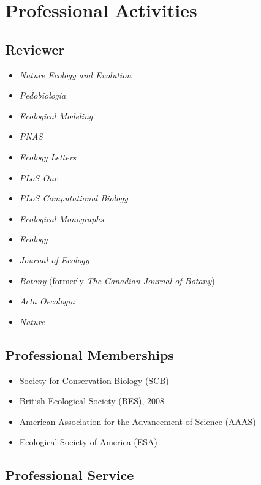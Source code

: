 \documentclass[a4paper]{article}
\begin{document}
\section{Professional Activities}\label{professional-activities}

\subsection{Reviewer}\label{article-reviewer}

\begin{itemize}
\item
  \emph{Nature Ecology and Evolution}
\item
  \emph{Pedobiologia}
\item
  \emph{Ecological Modeling}
\item
  \emph{PNAS}
\item
  \emph{Ecology Letters}
\item
  \emph{PLoS One}
\item
  \emph{PLoS Computational Biology}
\item
  \emph{Ecological Monographs}
\item
  \emph{Ecology}
\item
  \emph{Journal of Ecology}
\item
  \emph{Botany} (formerly \emph{The Canadian Journal of Botany})
\item
  \emph{Acta Oecologia}
\item
  \emph{Nature}
\end{itemize}

\subsection{Professional Memberships}\label{professional-memberships}

\begin{itemize}
\item
  \href{http://www.conbio.org/}{Society for Conservation Biology
  (SCB)}
\item
  \href{http://www.aaas.org/}{British Ecological Society (BES)}, 2008
\item
  \href{http://www.aaas.org/}{American Association for the Advancement
  of Science (AAAS)}
\item
  \href{http://www.esa.org/}{Ecological Society of America (ESA)}
\end{itemize}


\subsection{Professional Service}\label{professional-service}
\end{document}
